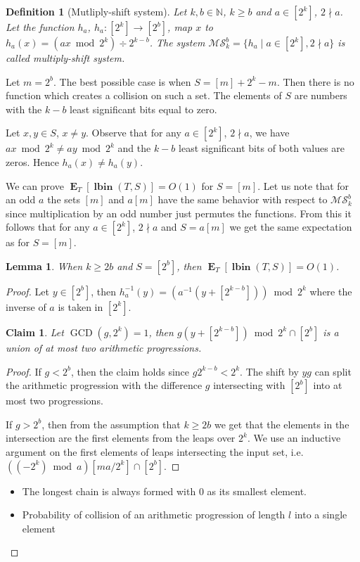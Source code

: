 \documentclass{article}
\newcommand{\lbin}[2]{\operatorname{\mathbf{lbin}}({#1}, {#2})}
\newcommand{\expects}[2]{\operatorname{\mathbf{E}}_{{#1}}\left[{#2}\right]}
\newtheorem{lemma}{Lemma}
\newtheorem{claim}{Claim}
\newtheorem{definition}{Definition}
\begin{document}
\begin{definition}[Mutliply-shift system]
Let $k, b \in \mathbb{N}$, $k \geq b$ and $a \in [2^k]$, $2 \nmid a$.
Let the function $h_a$, $h_a \colon [2^k] \to [2^b]$, map $x$ to $h_a(x) =(ax \bmod 2^k) \div 2^{k - b}$.
The system $\mathcal{MS}_{k}^{b} = \{h_a \mid a \in [2^k], 2 \nmid a\}$ is called \emph{multiply-shift system}.
\end{definition}

Let $m = 2^b$.
The best possible case is when $S = [m] + 2^{k} - m$. Then there is no function which creates a collision on such a set.
The elements of $S$ are numbers with the $k-b$ least significant bits equal to zero.

Let $x, y \in S$, $x \neq y$. Observe that for any $a \in [2^k]$, $2 \nmid a$, we have $ax \bmod 2^k \neq ay \bmod 2^k$ and the $k - b$ least significant bits of both values are zeros.
Hence $h_a(x) \neq h_a(y)$.

We can prove $\expects{T}{\lbin{T}{S}} = O(1)$ for $S = [m]$.
Let us note that for an odd $a$ the sets $[m]$ and $a[m]$ have the same behavior with respect to $\mathcal{MS}_{k}^{b}$ since multiplication by an odd number just permutes the functions.
From this it follows that for any $a \in [2^k]$, $2 \nmid a$ and $S = a[m]$ we get the same expectation as for $S = [m]$. 
\begin{lemma}
When $k \geq 2b$ and $S = [2^b]$, then $\expects{T}{\lbin{T}{S}} = O(1)$.
\end{lemma}
\begin{proof}
Let $y \in [2^b]$, then $h_a^{-1}(y) = (a^{-1} (y + [2^{k - b}])) \bmod 2^k$ where the inverse of $a$ is taken in $[2^k]$.
\begin{claim}
Let $\operatorname{GCD}(g, 2^k) = 1$, then $g(y + [2^{k - b}]) \bmod 2^{k} \cap [2^b]$ is a union of at most two arithmetic progressions.
\end{claim}
\begin{proof}
If $g < 2^b$, then the claim holds since $g2^{k - b} < 2^k$. The shift by $yg$ can split the arithmetic progression with the difference $g$ intersecting with $[2^{b}]$ into at most two progressions.

If $g > 2^b$, then from the assumption that $k \geq 2b$  we get that the elements in the intersection are the first elements from the leaps over $2^k$. We use an inductive argument on the first elements of leaps intersecting the input set, i.e. $((-2^k) \bmod a) [ma/2^k] \cap [2^b]$.
\end{proof}

\begin{itemize}
 \item The longest chain is always formed with $0$ as its smallest element.
 \item Probability of collision of an arithmetic progression of length $l$ into a single element
\end{itemize}
\end{proof}
\end{document}
